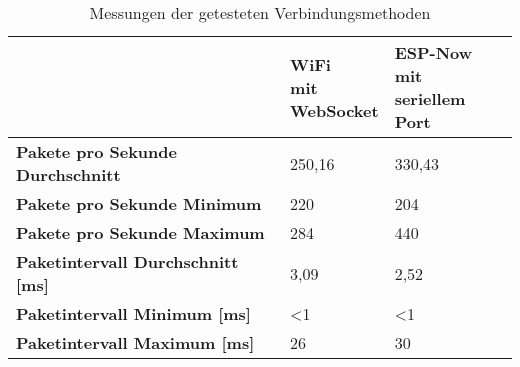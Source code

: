 \begin{table}[h]
    \centering
    \begin{threeparttable}
        \caption{Messungen der getesteten Verbindungsmethoden}
        \begin{tabular}{|l|l|l|}
            \hline
            ~                                                                 & \parbox[c][1.5cm]{2cm}{\textbf{WiFi          \\mit\\WebSocket}} & \parbox[c][1.5cm]{2.5cm}{\textbf{ESP-Now\\mit\\seriellem Port}} \\ \hline
            \parbox[c][0.5cm]{6cm}{\textbf{Pakete pro Sekunde Durchschnitt} } & 250,16                              & 330,43 \\ \hline
            \parbox[c][0.5cm]{6cm}{\textbf{Pakete pro Sekunde Minimum}      } & 220                                 & 204    \\ \hline
            \parbox[c][0.5cm]{6cm}{\textbf{Pakete pro Sekunde Maximum}      } & 284                                 & 440    \\ \hline
            \parbox[c][0.5cm]{6cm}{\textbf{Paketintervall Durchschnitt [ms]}} & 3,09                                & 2,52   \\ \hline
            \parbox[c][0.5cm]{6cm}{\textbf{Paketintervall Minimum [ms]}     } & <1                                  & <1     \\ \hline
            \parbox[c][0.5cm]{6cm}{\textbf{Paketintervall Maximum [ms]}     } & 26                                  & 30     \\ \hline
        \end{tabular}
        \label{tab:connectionStats}
    \end{threeparttable}
\end{table}

